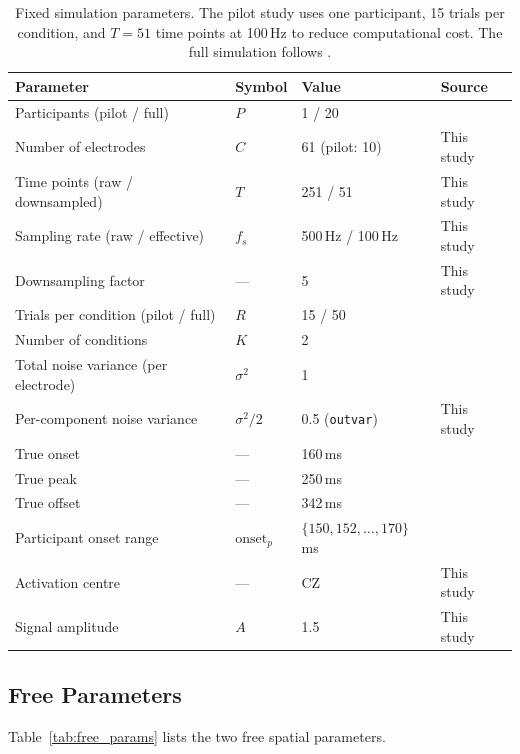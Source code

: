 \documentclass[12pt, a4paper]{article}
\begin{document}
\begin{table}[ht]
\centering
\caption{Fixed simulation parameters.
The pilot study uses one participant, 15 trials per condition,
and $T = 51$ time points at 100\,Hz to reduce computational cost.
The full simulation follows \citet{Nalborczyk2025}.}
\label{tab:fixed_params}
\small
\begin{tabular}{llll}
\toprule
\textbf{Parameter} & \textbf{Symbol} & \textbf{Value} & \textbf{Source} \\
\midrule
Participants (pilot / full)
  & $P$ & 1 / 20 & \citealt{Nalborczyk2025} \\
Number of electrodes
  & $C$ & 61 (pilot: 10) & This study \\
Time points (raw / downsampled)
  & $T$ & 251 / 51 & This study \\
Sampling rate (raw / effective)
  & $f_s$ & 500\,Hz / 100\,Hz & This study \\
Downsampling factor
  & --- & 5 & This study \\
Trials per condition (pilot / full)
  & $R$ & 15 / 50 & \citealt{Nalborczyk2025} \\
Number of conditions
  & $K$ & 2 & \citealt{Nalborczyk2025} \\
Total noise variance (per electrode)
  & $\sigma^2$ & 1 & \citealt{Nalborczyk2025} \\
Per-component noise variance
  & $\sigma^2/2$ & 0.5 (\texttt{outvar}) & This study \\
True onset
  & --- & 160\,ms & \citealt{Rousselet2025} \\
True peak
  & --- & 250\,ms & \citealt{Rousselet2025} \\
True offset
  & --- & 342\,ms & \citealt{Rousselet2025} \\
Participant onset range
  & $\mathrm{onset}_p$ & $\{150,152,\ldots,170\}$\,ms & \citealt{Nalborczyk2025} \\
Activation centre
  & --- & CZ & This study \\
Signal amplitude
  & $A$ & 1.5 & This study \\
\bottomrule
\end{tabular}
\end{table}

\subsection{Free Parameters}

Table~\ref{tab:free_params} lists the two free spatial parameters.
\end{document}
